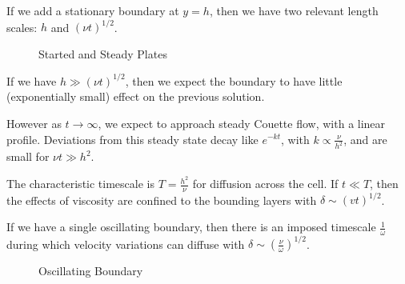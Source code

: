 \documentclass[12pt]{article}
\begin{document}
If we add a stationary boundary at $y = h$, then we have two relevant length scales: $h$ and $(\nu t)^{1/2}$.

\begin{figure}[h]
	\centering
	\caption{Started and Steady Plates}
	\label{fig:started_and_steady}
\end{figure}

If we have $h \gg (\nu t)^{1/2}$, then we expect the boundary to have little (exponentially small) effect on the previous solution.

However as $t \to \infty$, we expect to approach steady Couette flow, with a linear profile. Deviations from this steady state decay like $e^{-kt}$, with $k \propto \frac{\nu}{h^2}$, and are small for $\nu t \gg h^2$.

The characteristic timescale is $T = \frac{h^2}{\nu}$ for diffusion across the cell. If $t \ll T$, then the effects of viscosity are confined to the bounding layers with $\delta \sim (vt)^{1/2}$.

If we have a single oscillating boundary, then there is an imposed timescale $\frac{1}{\omega}$ during which velocity variations can diffuse with $\delta \sim (\frac{\nu}{\omega})^{1/2}$.

\begin{figure}[h]
	\centering
	\caption{Oscillating Boundary}
	\label{fig:oscillating}
\end{figure}
\end{document}
